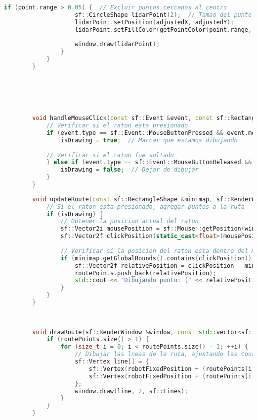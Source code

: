 \begin{lstlisting}[language={C++}, caption={Primer ajuste de c\'odigo}, label={Script}]
                if (point.range > 0.05) {  // Excluir puntos cercanos al centro
                    sf::CircleShape lidarPoint(2);  // Tamao del punto
                    lidarPoint.setPosition(adjustedX, adjustedY);
                    lidarPoint.setFillColor(getPointColor(point.range, max_range));  // Color basado en la distancia
        
                    window.draw(lidarPoint);
                }
            }
        }
        
        
        
        
        
        
        void handleMouseClick(const sf::Event &event, const sf::RectangleShape &minimap) {
            // Verificar si el raton esta presionado
            if (event.type == sf::Event::MouseButtonPressed && event.mouseButton.button == sf::Mouse::Left) {
                isDrawing = true;  // Marcar que estamos dibujando
        
            // Verificar si el raton fue soltado
            } else if (event.type == sf::Event::MouseButtonReleased && event.mouseButton.button == sf::Mouse::Left) {
                isDrawing = false;  // Dejar de dibujar
            }
        }
        
        void updateRoute(const sf::RectangleShape &minimap, sf::RenderWindow &window) {
            // Si el raton esta presionado, agregar puntos a la ruta
            if (isDrawing) {
                // Obtener la posicion actual del raton
                sf::Vector2i mousePosition = sf::Mouse::getPosition(window);
                sf::Vector2f clickPosition(static_cast<float>(mousePosition.x), static_cast<float>(mousePosition.y));
        
                // Verificar si la posicion del raton esta dentro del minimapa
                if (minimap.getGlobalBounds().contains(clickPosition)) {
                    sf::Vector2f relativePosition = clickPosition - minimap.getPosition();
                    routePoints.push_back(relativePosition);
                    std::cout << "Dibujando punto: (" << relativePosition.x << ", " << relativePosition.y << ")" << std::endl;
                }
            }
        }
        
        
        
        void drawRoute(sf::RenderWindow &window, const std::vector<sf::Vector2f> &routePoints, const sf::Vector2f &robotPosition) {
            if (routePoints.size() > 1) {
                for (size_t i = 0; i < routePoints.size() - 1; ++i) {
                    // Dibujar las lneas de la ruta, ajustando las coordenadas en funcin de la posicin del robot
                    sf::Vertex line[] = {
                        sf::Vertex(robotFixedPosition + (routePoints[i] - robotPosition), sf::Color::Red),  // Ajustar posicin en funcin del robot
                        sf::Vertex(robotFixedPosition + (routePoints[i + 1] - robotPosition), sf::Color::Red)
                    };
                    window.draw(line, 2, sf::Lines);
                }
            }
        }
        

\end{lstlisting}
